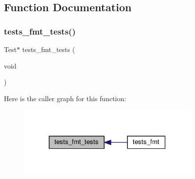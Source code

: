 \subsection{Function Documentation}
\mbox{\label{tests-fmt_8c_a1d630c6f7fbcf08065b19047d93f77fd}} 
\subsubsection{\texorpdfstring{tests\+\_\+fmt\+\_\+tests()}{tests\_fmt\_tests()}}
{\footnotesize\ttfamily Test$\ast$ tests\+\_\+fmt\+\_\+tests (\begin{DoxyParamCaption}\item[{void}]{ }\end{DoxyParamCaption})}

Here is the caller graph for this function\+:
\nopagebreak
\begin{figure}[H]
\begin{center}
\leavevmode
\includegraphics[width=259pt]{tests-fmt_8c_a1d630c6f7fbcf08065b19047d93f77fd_icgraph}
\end{center}
\end{figure}
